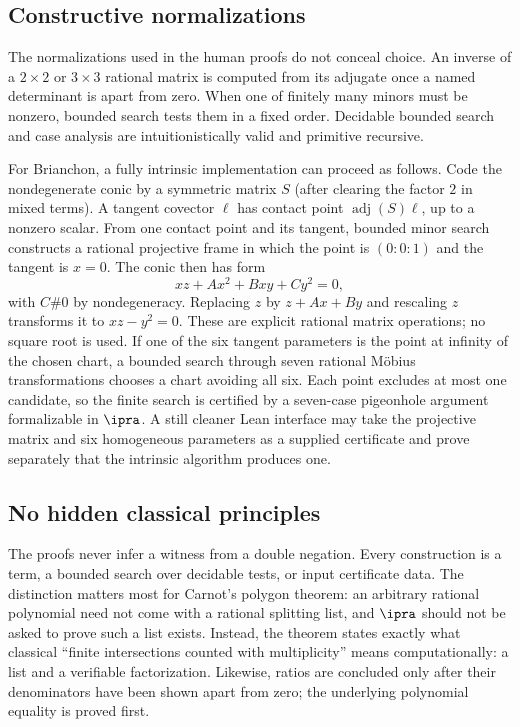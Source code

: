 \subsection{Constructive normalizations}

The normalizations used in the human proofs do not conceal choice.  An
inverse of a $2\times2$ or $3\times3$ rational matrix is computed from its
adjugate once a named determinant is apart from zero.  When one of finitely
many minors must be nonzero, bounded search tests them in a fixed order.
Decidable bounded search and case analysis are intuitionistically valid and
primitive recursive.

For Brianchon, a fully intrinsic implementation can proceed as follows.  Code
the nondegenerate conic by a symmetric matrix $S$ (after clearing the factor
$2$ in mixed terms).  A tangent covector $\ell$ has contact point
$\operatorname{adj}(S)\ell$, up to a nonzero scalar.  From one contact point
and its tangent, bounded minor search constructs a rational projective frame
in which the point is $(0:0:1)$ and the tangent is $x=0$.  The conic then has
form
\[
 xz+A x^2+Bxy+C y^2=0,
\]
with $C\#0$ by nondegeneracy.  Replacing $z$ by $z+Ax+By$ and rescaling $z$
transforms it to $xz-y^2=0$.  These are explicit rational matrix operations;
no square root is used.  If one of the six tangent parameters is the point at
infinity of the chosen chart, a bounded search through seven rational
M\"obius transformations chooses a chart avoiding all six.  Each point excludes
at most one candidate, so the finite search is certified by a seven-case
pigeonhole argument formalizable in $\ipra$.  A still cleaner Lean interface
may take the projective matrix and six homogeneous parameters as a supplied
certificate and prove separately that the intrinsic algorithm produces one.

\subsection{No hidden classical principles}

The proofs never infer a witness from a double negation.  Every construction
is a term, a bounded search over decidable tests, or input certificate data.
The distinction matters most for Carnot's polygon theorem: an arbitrary
rational polynomial need not come with a rational splitting list, and
$\ipra$ should not be asked to prove such a list exists.  Instead, the theorem
states exactly what classical ``finite intersections counted with
multiplicity'' means computationally: a list and a verifiable factorization.
Likewise, ratios are concluded only after their denominators have been shown
apart from zero; the underlying polynomial equality is proved first.

